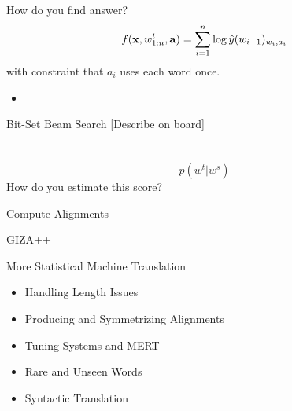 \documentclass{beamer}
\begin{document}
\begin{frame}{How do you find answer?}
  \[ f(\mathbf{x}, w^t_{1:n}, \mathbf{a}) = \sum_{i=1}^n \log \hat{y}(w_{i-1})_{w_i, a_i} \]  
  with constraint that $a_i$ uses each word once.  

  \begin{itemize}
  \item 
  \end{itemize}
\end{frame}

\begin{frame}{Bit-Set Beam Search}
  [Describe on board] 
\end{frame}


\section{}

\begin{frame}
  \[ p(w^t | w^s) \] 
  How do you estimate this score? 
\end{frame}

\begin{frame}{Compute Alignments}
  
\end{frame}

\begin{frame}{GIZA++}
  
\end{frame}

\begin{frame}{More Statistical Machine Translation}
  \begin{itemize}
  \item Handling Length Issues
  \item Producing and Symmetrizing Alignments
  \item Tuning Systems and MERT 
  \item Rare and Unseen Words
  \item Syntactic Translation
  \end{itemize}
\end{frame}
\end{document}
